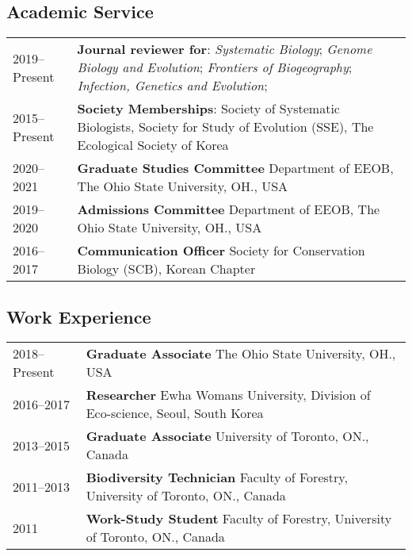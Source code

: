 \documentclass[11pt]{article}
\begin{document}
\subsection*{Academic Service}
\begin{longtable}{p{}  p{}}
2019--Present &	\textbf{Journal reviewer for}: \textit{Systematic Biology}; \textit{Genome Biology and Evolution}; \textit{Frontiers of Biogeography}; \textit{Infection, Genetics and Evolution};\\
2015--Present &  \textbf{Society Memberships}: Society of Systematic Biologists, Society for Study of Evolution (SSE), The Ecological Society of Korea\\

2020--2021 &  \textbf{Graduate Studies Committee} Department of EEOB, The Ohio State University, OH., USA\\
2019--2020 &	\textbf{Admissions Committee} Department of EEOB, The Ohio State University, OH., USA\\
2016--2017 &	\textbf{Communication Officer} Society for Conservation Biology (SCB), Korean Chapter\vspace{5pt}\\
\end{longtable}





\subsection*{Work Experience}
\begin{longtable}{p{}  p{}}
2018--Present & \textbf{Graduate Associate} The Ohio State University, OH., USA\\
2016--2017 & \textbf{Researcher} Ewha Womans University, Division of Eco-science, Seoul, South Korea\\%
2013--2015 & \textbf{Graduate Associate} University of Toronto, ON., Canada\\
2011--2013 &	\textbf{Biodiversity Technician} Faculty of Forestry, University of Toronto, ON., Canada\\%
2011&	\textbf{Work-Study Student} Faculty of Forestry, University of Toronto, ON., Canada\vspace{5pt}\\%
\end{longtable}
\end{document}
